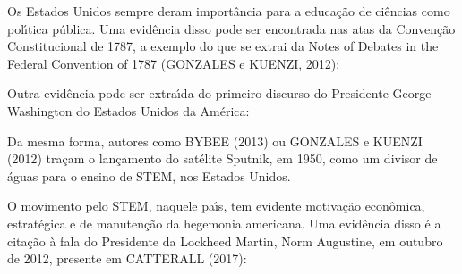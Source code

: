 \documentclass[
12pt,		%
openright,	%
twoside,  %
a4paper,			%
chapter=TITLE,		%
english,			%
french,				%
spanish,			%
brazil				%
]{USPSC-classe/USPSC}
\begin{document}
Os Estados Unidos sempre deram import\^ancia para a educa\c{c}\~ao de ci\^encias como pol\'{\i}tica p\'ublica. Uma evid\^encia disso pode ser encontrada nas atas da Conven\c{c}\~ao Constitucional de 1787, a exemplo do que se extrai da \textquotedbl Notes of Debates in the Federal Convention of 1787  (GONZALES e KUENZI, 2012):









\noindent\begin{center}\mbox{\centering{}}\end{center}


Outra evid\^encia pode ser extra\'{\i}da do primeiro discurso do Presidente George Washington do Estados Unidos da Am\'erica:









\noindent\begin{center}\mbox{\centering{}}\end{center}


Da mesma forma, autores como  BYBEE (2013)  ou  GONZALES e KUENZI (2012) tra\c{c}am o lan\c{c}amento do sat\'elite Sputnik, em 1950, como um divisor de \'aguas para o ensino de STEM, nos Estados Unidos.








O movimento pelo STEM, naquele pa\'{\i}s, tem evidente motiva\c{c}\~ao econ\^omica, estrat\'egica e de manuten\c{c}\~ao da hegemonia americana. Uma evid\^encia disso \'e a cita\c{c}\~ao \`a fala do Presidente da Lockheed Martin, Norm Augustine, em outubro de 2012, presente em  CATTERALL (2017):
\end{document}
